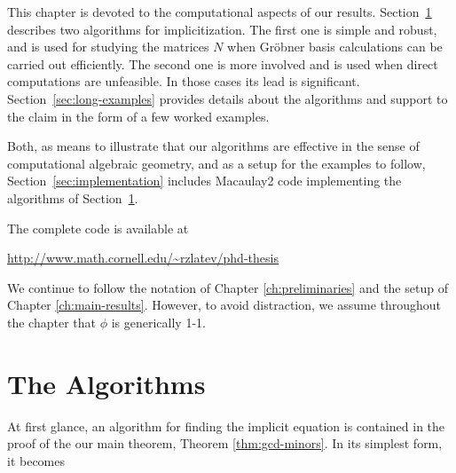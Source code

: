 \documentclass[fleqn,reqno]{amsart}
\newcounter{chapter}
\numberwithin{first}{chapter}
\begin{document}



\begin{paragraf*}
This chapter is devoted to the computational aspects of our results.
Section~\ref{sec:algorithms} describes two algorithms for implicitization.
The first one is simple and robust, and is used for studying the matrices $N$
when Gr\"obner basis calculations can be carried out efficiently.
The second one is more involved and is used when direct computations are unfeasible.
In those cases its lead is significant.
Section~\ref{sec:long-examples} provides details about the algorithms
and support to the claim in the form of a few worked examples.
\end{paragraf*}

\begin{paragraf*}
Both, as means to illustrate that our algorithms are effective in the sense of
computational algebraic geometry,
and as a setup for the examples to follow,
Section~\ref{sec:implementation} includes Macaulay2 code implementing
the algorithms of Section~\ref{sec:algorithms}.
\end{paragraf*}

\begin{paragraf*}
The complete code is available at
\begin{center}
	\url{http://www.math.cornell.edu/~rzlatev/phd-thesis}
\end{center}
\end{paragraf*}

\begin{paragraf*}
We continue to follow the notation of Chapter \ref{ch:preliminaries}
and the setup of Chapter \ref{ch:main-results}.
However, to avoid distraction, we assume throughout the chapter that $\phi$ is generically 1-1.
\end{paragraf*}



\section{The Algorithms}
\label{sec:algorithms}

\begin{paragraf*}
At first glance, an algorithm for finding the implicit equation is contained in the proof
of the our main theorem, Theorem \ref{thm:gcd-minors}.
In its simplest form, it becomes
\end{paragraf*}
\end{document}
